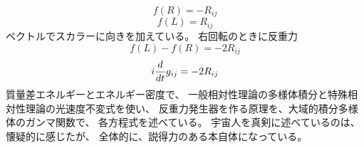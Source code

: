 \documentclass{jsarticle}
\begin{document}
\title{}
\author{}
\date{}
\maketitle


    $$ f(R) = - R_{ij} $$
    $$ f(L) = R_{ij} $$
    ベクトルでスカラーに向きを加えている。
    右回転のときに反重力
    $$ f(L) - f(R) = -2 R_{ij} $$
    $$i {d \over dt}g_{ij} = - 2 R_{ij} $$
    質量差エネルギーとエネルギー密度で、
    一般相対性理論の多様体積分と特殊相対性理論の光速度不変式を使い、
    反重力発生器を作る原理を、大域的積分多様体のガンマ関数で、
    各方程式を述べている。
    宇宙人を真剣に述べているのは、懐疑的に感じたが、
    全体的に、説得力のある本自体になっている。　
\end{document}
